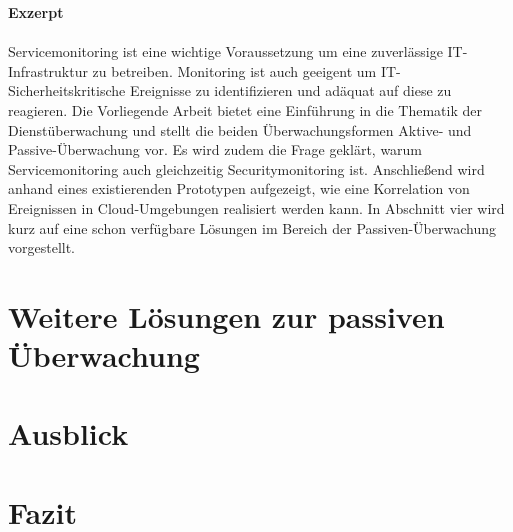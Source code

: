 \documentclass[a4paper,10pt]{scrreprt}
\begin{document}
\vspace*{\fill}
\textbf{Exzerpt}\\\\
    Servicemonitoring ist eine wichtige Voraussetzung um eine zuverlässige 
    IT-Infrastruktur zu betreiben. Monitoring ist auch geeigent um IT-Sicherheitskritische
    Ereignisse zu identifizieren und adäquat auf diese zu reagieren. Die Vorliegende
    Arbeit bietet eine Einführung in die Thematik der Dienstüberwachung und stellt die
    beiden Überwachungsformen Aktive- und Passive-Überwachung vor. Es wird zudem
    die Frage geklärt, warum Servicemonitoring auch gleichzeitig Securitymonitoring ist.
    Anschließend wird
    anhand eines existierenden Prototypen aufgezeigt, wie eine Korrelation von 
    Ereignissen in Cloud-Umgebungen realisiert werden kann. In Abschnitt vier wird
    kurz auf eine schon verfügbare Lösungen im Bereich der Passiven-Überwachung 
    vorgestellt. 
\vspace*{\fill}


\tableofcontents
\thispagestyle{fancy}


\cleardoubleemptypage


\chapter{Weitere Lösungen zur passiven Überwachung}\label{elk}
\thispagestyle{fancy}

\chapter{Ausblick}
\thispagestyle{fancy}

\chapter{Fazit}
\thispagestyle{fancy}

{}

\thispagestyle{fancy}

\listoffigures
\thispagestyle{fancy}
\end{document}

